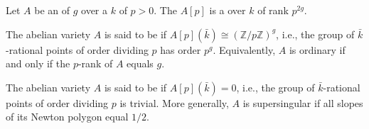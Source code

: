 \begin{definition} \label{definition:ordinary_and_supersingular_abelian_varieties_over_a_field_of_characteristic_p}
    Let $A$ be an  of  $g$ over a  $k$ of  $p > 0$.
    The  $A[p]$ is a   over $k$ of rank $p^{2g}$.

    The abelian variety $A$ is said to be  if $A[p](\bar{k}) \cong (\mathbb{Z}/p\mathbb{Z})^g$, i.e., the group of $\bar{k}$-rational points of order dividing $p$ has order $p^g$. Equivalently, $A$ is ordinary if and only if the $p$-rank of $A$ equals $g$.

    The abelian variety $A$ is said to be  if $A[p](\bar{k}) = 0$, i.e., the group of $\bar{k}$-rational points of order dividing $p$ is trivial. More generally, $A$ is supersingular if all slopes of its Newton polygon equal $1/2$.
\end{definition}
